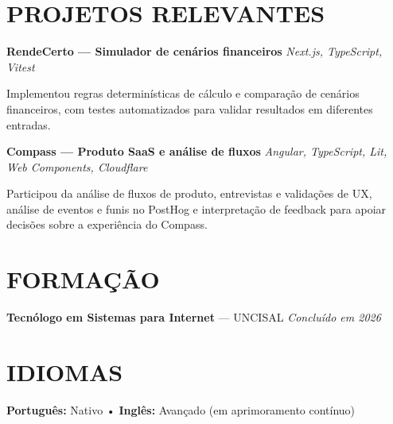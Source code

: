 \documentclass[10pt,a4paper]{article}
\begin{document}

\section*{PROJETOS RELEVANTES}

\noindent
\textbf{RendeCerto — Simulador de cenários financeiros}
\hfill
\textit{Next.js, TypeScript, Vitest}

\footnotesize

Implementou regras determinísticas de cálculo e comparação de cenários financeiros, com testes automatizados para validar resultados em diferentes entradas.

\vspace{0.5pt}

\noindent
\textbf{Compass — Produto SaaS e análise de fluxos}
\hfill
\textit{Angular, TypeScript, Lit, Web Components, Cloudflare}

\footnotesize

Participou da análise de fluxos de produto, entrevistas e validações de UX, análise de eventos e funis no PostHog e interpretação de feedback para apoiar decisões sobre a experiência do Compass.


\section*{FORMAÇÃO}

\noindent
\textbf{Tecnólogo em Sistemas para Internet} — UNCISAL
\hfill
\textit{Concluído em 2026}


\vspace{-2pt}
\section*{IDIOMAS}

\noindent
\textbf{Português:} Nativo
\quad • \quad
\textbf{Inglês:} Avançado (em aprimoramento contínuo)
\end{document}
